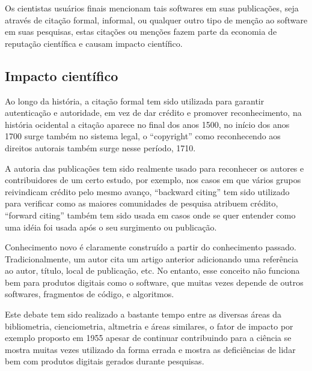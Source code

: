 Os cientistas usuários finais mencionam tais softwares em suas publicações,
seja através de citação formal, informal, ou qualquer outro tipo de menção ao
software em suas pesquisas, estas citações ou menções fazem parte da economia
de reputação científica e causam impacto científico.

\subsection{Impacto científico}


Ao longo da história, a citação formal tem sido utilizada para garantir
autenticação e autoridade, em vez de dar crédito e promover reconhecimento, na
história ocidental a citação aparece no final dos anos 1500, no início dos anos
1700 surge também no sistema legal, o ``copyright'' como reconhecendo aos
direitos autorais também surge nesse período, 1710.

A autoria das publicações tem sido realmente usado para reconhecer os autores e
contribuidores de um certo estudo, por exemplo, nos casos em que vários grupos
reivindicam crédito pelo mesmo avanço, ``backward citing'' tem sido utilizado
para verificar como as maiores comunidades de pesquisa atribuem crédito,
``forward citing'' também tem sido usada em casos onde se quer entender como
uma idéia foi usada após o seu surgimento ou publicação.

Conhecimento novo é claramente construído a partir do conhecimento passado.
Tradicionalmente, um autor cita um artigo anterior adicionando uma referência
ao autor, título, local de publicação, etc. No entanto, esse conceito não
funciona bem para produtos digitais como o software, que muitas vezes depende
de outros softwares, fragmentos de código, e algoritmos.

Este debate tem sido realizado a bastante tempo entre as diversas áreas da
bibliometria, cienciometria, altmetria e áreas similares, o fator de impacto
por exemplo proposto em 1955 apesar de continuar contribuindo para a ciência se
mostra muitas vezes utilizado da forma errada e mostra as deficiências de lidar
bem com produtos digitais gerados durante pesquisas.


